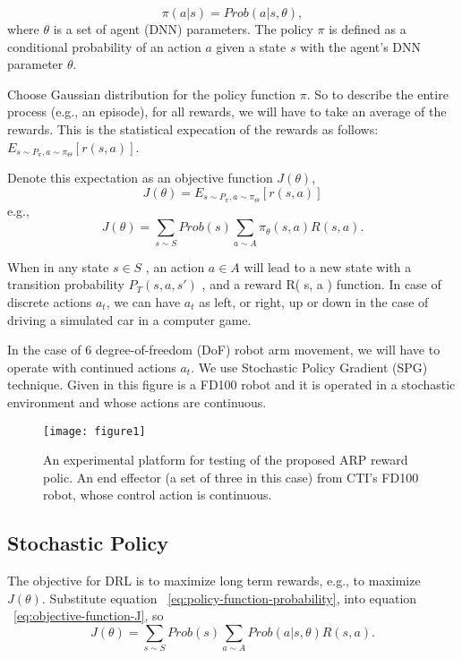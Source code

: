 \documentclass[conference]{IEEEtran}
\begin{document}
\begin{equation}
{\pi}(a|s) = Prob(a|s, \theta) ,
\label{eq:policy-function-probability} 
\end{equation}
where $\theta$ is a set of agent (DNN) parameters. The 
policy $\pi$ is defined as a conditional probability
of an action $a$ given a state $s$ with the agent's 
DNN parameter $\theta$.

Choose Gaussian distribution for the policy function 
$\pi$. So to describe the entire process (e.g., an episode), 
for all rewards, we will have to take an average
of the rewards. This is the statistical expecation 
of the rewards as follows: 
$E_{s \sim P_{\pi} , a \sim {\pi}_{\Theta}} [ r(s, a) ]$. 

Denote this expectation as an objective function
$J({\theta})$, 
\begin{equation}
J({\theta}) = E_{s \sim P_{\pi} , a \sim {\pi}_{\Theta}} [ r(s, a) ]
\end{equation}
e.g.,  
\begin{equation}
J({\theta}) = 
\displaystyle
\sum_{s \sim S} Prob(s) \sum_{a \sim A} {\pi}_{\theta}(s,a) R (s, a) . 
\label{eq:objective-function-J} 
\end{equation}

When in any state $s \in S$ , an action $a \in A$ 
will lead to a new state with a transition 
probability $P_T ( s, a, s\prime )$ , and 
a reward R( s, a ) function.
In case of discrete actions $a_t$, we can 
have $a_t$ as left, or right, up or down in the 
case of driving a simulated car in a computer 
game. 

In the case of 6 degree-of-freedom 
(DoF) robot arm movement, we will have to operate with 
continued actions $a_t$. We use Stochastic 
Policy Gradient (SPG) technique. 
Given in this figure is 
a FD100 robot and it is operated in a 
stochastic environment and whose actions 
are continuous.  

\begin{figure}[H] 
\centering
\texttt{[image: figure1]} %
\caption{An experimental platform for 
testing of the proposed ARP reward polic. An end effector 
(a set of three in this case) from CTI's FD100 robot, whose
control action is continuous.}
\label{fig1} 
\end{figure} 

\subsection{Stochastic Policy}
The objective for DRL is to maximize long term rewards, 
e.g., to maximize $J({\theta})$.  
Substitute equation ~\ref{eq:policy-function-probability},  
into equation 
~\ref{eq:objective-function-J}, so    
\begin{equation}
J({\theta}) = 
\displaystyle
\sum_{s \sim S} Prob(s) \sum_{a \sim A}Prob(a|s, \theta) R (s, a) . 
\label{eq:objective-function-J-probability} 
\end{equation}
\end{document}
